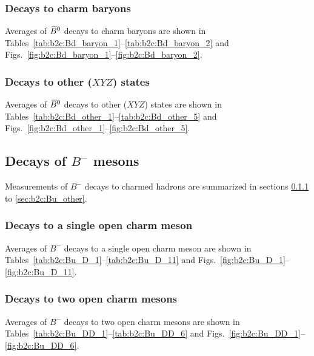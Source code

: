 \subsubsection{Decays to charm baryons}
\label{sec:b2c:Bd_baryon}
Averages of $\kern 0.18em\overline{\kern -0.18em B}{}^0$ decays to charm baryons are shown in Tables~\ref{tab:b2c:Bd_baryon_1}--\ref{tab:b2c:Bd_baryon_2} and Figs.~\ref{fig:b2c:Bd_baryon_1}--\ref{fig:b2c:Bd_baryon_2}.

\subsubsection{Decays to other ($XYZ$) states}
\label{sec:b2c:Bd_other}
Averages of $\kern 0.18em\overline{\kern -0.18em B}{}^0$ decays to other ($XYZ$) states are shown in Tables~\ref{tab:b2c:Bd_other_1}--\ref{tab:b2c:Bd_other_5} and Figs.~\ref{fig:b2c:Bd_other_1}--\ref{fig:b2c:Bd_other_5}.


\subsection{Decays of $B^-$ mesons}
\label{sec:b2c:Bu}
Measurements of $B^-$ decays to charmed hadrons are summarized in sections \ref{sec:b2c:Bu_D} to \ref{sec:b2c:Bu_other}.

\subsubsection{Decays to a single open charm meson}
\label{sec:b2c:Bu_D}
Averages of $B^-$ decays to a single open charm meson are shown in Tables~\ref{tab:b2c:Bu_D_1}--\ref{tab:b2c:Bu_D_11} and Figs.~\ref{fig:b2c:Bu_D_1}--\ref{fig:b2c:Bu_D_11}.

\subsubsection{Decays to two open charm mesons}
\label{sec:b2c:Bu_DD}
Averages of $B^-$ decays to two open charm mesons are shown in Tables~\ref{tab:b2c:Bu_DD_1}--\ref{tab:b2c:Bu_DD_6} and Figs.~\ref{fig:b2c:Bu_DD_1}--\ref{fig:b2c:Bu_DD_6}.


